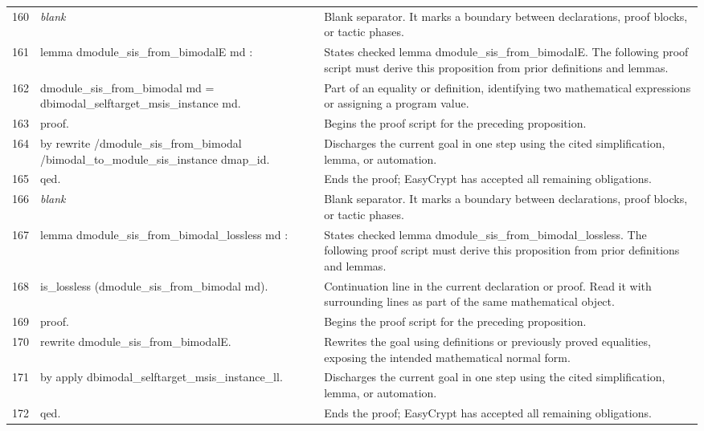 \documentclass[10pt]{article}
\begin{document}
\begin{longtable}{r L{0.53\textwidth} L{0.37\textwidth}}
160 & {\ttfamily\scriptsize \emph{blank}} & Blank separator.  It marks a boundary between declarations, proof blocks, or tactic phases. \\
161 & {\ttfamily\scriptsize lemma dmodule\_sis\_from\_bimodalE md :} & States checked lemma dmodule\_sis\_from\_bimodalE.  The following proof script must derive this proposition from prior definitions and lemmas. \\
162 & {\ttfamily\scriptsize   dmodule\_sis\_from\_bimodal md = dbimodal\_selftarget\_msis\_instance md.} & Part of an equality or definition, identifying two mathematical expressions or assigning a program value. \\
163 & {\ttfamily\scriptsize proof.} & Begins the proof script for the preceding proposition. \\
164 & {\ttfamily\scriptsize by rewrite /dmodule\_sis\_from\_bimodal /bimodal\_to\_module\_sis\_instance dmap\_id.} & Discharges the current goal in one step using the cited simplification, lemma, or automation. \\
165 & {\ttfamily\scriptsize qed.} & Ends the proof; EasyCrypt has accepted all remaining obligations. \\
166 & {\ttfamily\scriptsize \emph{blank}} & Blank separator.  It marks a boundary between declarations, proof blocks, or tactic phases. \\
167 & {\ttfamily\scriptsize lemma dmodule\_sis\_from\_bimodal\_lossless md :} & States checked lemma dmodule\_sis\_from\_bimodal\_lossless.  The following proof script must derive this proposition from prior definitions and lemmas. \\
168 & {\ttfamily\scriptsize   is\_lossless (dmodule\_sis\_from\_bimodal md).} & Continuation line in the current declaration or proof.  Read it with surrounding lines as part of the same mathematical object. \\
169 & {\ttfamily\scriptsize proof.} & Begins the proof script for the preceding proposition. \\
170 & {\ttfamily\scriptsize rewrite dmodule\_sis\_from\_bimodalE.} & Rewrites the goal using definitions or previously proved equalities, exposing the intended mathematical normal form. \\
171 & {\ttfamily\scriptsize by apply dbimodal\_selftarget\_msis\_instance\_ll.} & Discharges the current goal in one step using the cited simplification, lemma, or automation. \\
172 & {\ttfamily\scriptsize qed.} & Ends the proof; EasyCrypt has accepted all remaining obligations. \\

\end{longtable}
\end{document}
